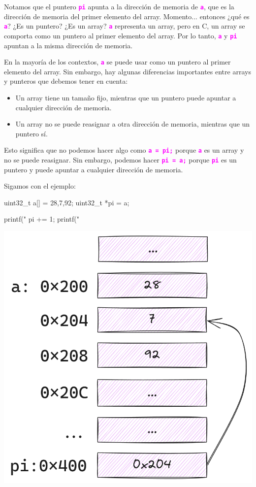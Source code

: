 \documentclass[]{scrartcl}
\newcommand{\hl}[1]{\textcolor{magenta}{\textbf{\texttt{#1}}}}
\begin{document}
\vspace {0.5cm}
Notamos que el puntero \hl{pi} apunta a la dirección de memoria de \hl{a}, que es la dirección de memoria del primer elemento del array. Momento... entonces ¿qué es \hl{a}? ¿Es un puntero? ¿Es un array? \hl{a} representa un array, pero en C, un array se comporta como un puntero al primer elemento del array. Por lo tanto, \hl{a} y \hl{pi} apuntan a la misma dirección de memoria.

En la mayoría de los contextos, \hl{a} se puede usar como un puntero al primer elemento del array. Sin embargo, hay algunas diferencias importantes entre arrays y punteros que debemos tener en cuenta:
\begin{itemize}
  \item Un array tiene un tamaño fijo, mientras que un puntero puede apuntar a cualquier dirección de memoria.
  \item Un array no se puede reasignar a otra dirección de memoria, mientras que un puntero sí.
\end{itemize}
Esto significa que no podemos hacer algo como \hl{a = pi;} porque \hl{a} es un array y no se puede reasignar. Sin embargo, podemos hacer \hl{pi = a;} porque \hl{pi} es un puntero y puede apuntar a cualquier dirección de memoria.

Sigamos con el ejemplo:

\vspace {0.5cm}
\noindent
\begin{minipage}[t]{0.52\textwidth}
  \begin{cbox}[]{}
    uint32_t a[] = {28,7,92};
    uint32_t *pi = a;
    
    printf("%
    pi += 1;
    printf("%
  \end{cbox}
\end{minipage}
\hfill
\begin{minipage}[t]{0.45\textwidth}
  \includegraphics[width=\linewidth]{img/pointers_arith.02.png}
\end{minipage}
\end{document}
